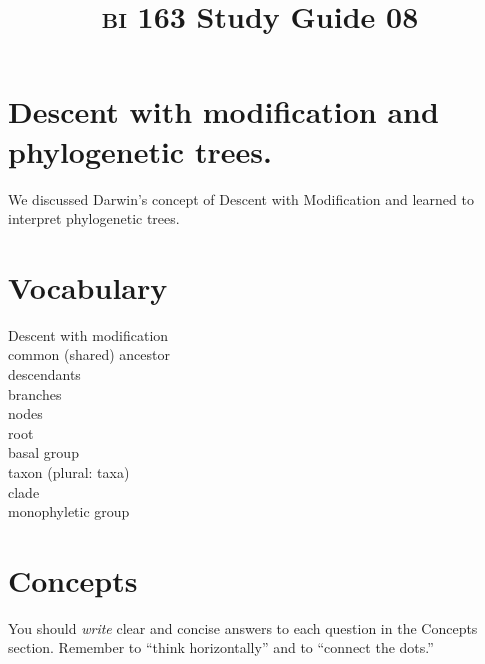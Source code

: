 \documentclass[letterpaper]{tufte-handout}
\title{{\scshape bi} 163 Study Guide 08}
\date{} %
\begin{document}
\maketitle	%

\section*{Descent with modification and phylogenetic trees.}

We discussed Darwin's concept of Descent with Modification and learned to interpret phylogenetic trees.

\section*{Vocabulary}

\vspace{-1\baselineskip}
\begin{multicols}{2}
Descent with modification\\
common (shared) ancestor \\
descendants \\
branches \\
nodes \\
root \\
basal group \\
taxon (plural: taxa) \\
clade \\
monophyletic group \\

\end{multicols}

\section*{Concepts}

You should \emph{write} clear and concise answers to each question in the Concepts section.  Remember to ``think horizontally'' and to ``connect the dots.'' 
\end{document}
